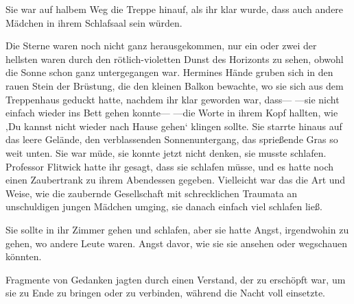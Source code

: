 Sie war auf halbem Weg die Treppe hinauf, als ihr klar wurde, dass auch andere Mädchen in ihrem Schlafsaal sein würden.

\later

Die Sterne waren noch nicht ganz herausgekommen, nur ein oder zwei der hellsten waren durch den rötlich-violetten Dunst des Horizonts zu sehen, obwohl die Sonne schon ganz untergegangen war.
%
Hermines Hände gruben sich in den rauen Stein der Brüstung, die den kleinen Balkon bewachte, wo sie sich aus dem Treppenhaus geduckt hatte, nachdem ihr klar geworden war, dass—
—sie nicht einfach wieder ins Bett gehen konnte—
—die Worte in ihrem Kopf hallten, wie ‚Du kannst nicht wieder nach Hause gehen‘ klingen sollte.
Sie starrte hinaus auf das leere Gelände, den verblassenden Sonnenuntergang, das sprießende Gras so weit unten.
Sie war müde, sie konnte jetzt nicht denken, sie musste schlafen. Professor Flitwick hatte ihr gesagt, dass sie schlafen müsse, und es hatte noch einen Zaubertrank zu ihrem Abendessen gegeben.
Vielleicht war das die Art und Weise, wie die zaubernde Gesellschaft mit schrecklichen Traumata an unschuldigen jungen Mädchen umging, sie danach einfach viel schlafen ließ.

Sie sollte in ihr Zimmer gehen und schlafen, aber sie hatte Angst, irgendwohin zu gehen, wo andere Leute waren. Angst davor, wie sie sie ansehen oder wegschauen könnten.

Fragmente von Gedanken jagten durch einen Verstand, der zu erschöpft war, um sie zu Ende zu bringen oder zu verbinden, während die Nacht voll einsetzte.

